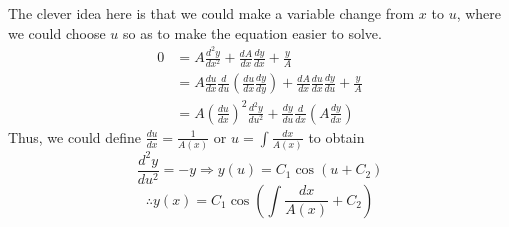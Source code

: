\item

The clever idea here is that we could make a variable change from $x$ to $u$,
where we could choose $u$ so as to make the equation easier to solve.
\begin{align*}
	0
	 & = A \frac{d^2 y}{dx^2} + \frac{dA}{dx} \frac{dy}{dx} + \frac{y}{A}        \\
	 & = A \frac{du}{dx} \frac{d}{du} \left( \frac{du}{dx} \frac{dy}{dy} \right)
	+ \frac{dA}{dx} \frac{du}{dx} \frac{dy}{du} + \frac{y}{A}                    \\
	 & = A {\left( \frac{du}{dx} \right)}^2 \frac{d^2 y}{du^2}
	+ \frac{dy}{du} \frac{d}{dx} \left( A \frac{dy}{dx} \right)
\end{align*}
Thus, we could define $\frac{du}{dx} = \frac{1}{A(x)}$ or $u = \int \frac{dx}{A(x)}$ to obtain
\[
	\frac{d^2 y}{du^2} = -y
	\Rightarrow y(u) = C_1 \cos \left( u + C_2 \right)
\]
\[
	\therefore y(x) = C_1 \cos \left( \int \frac{dx}{A(x)} + C_2 \right)
\]